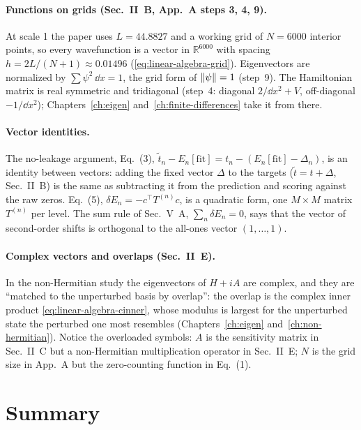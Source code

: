 \paragraph{Functions on grids (Sec.~II~B, App.~A steps 3, 4, 9).} At scale 1 the paper uses $L=44.8827$ and a working grid of $N=6000$ interior points, so every wavefunction is a vector in $\mathbb R^{6000}$ with spacing $h=2L/(N+1)\approx0.01496$ (\cref{eq:linear-algebra-grid}). Eigenvectors are normalized by $\sum\psi^2\,\dd x=1$, the grid form of $\left\lVert \psi\right\rVert=1$ (step~9). The Hamiltonian matrix is real symmetric and tridiagonal (step~4: diagonal $2/\dd x^2+V$, off-diagonal $-1/\dd x^2$); Chapters~\ref{ch:eigen} and~\ref{ch:finite-differences} take it from there.

\paragraph{Vector identities.} The no-leakage argument, Eq.~(3), $\tilde t_n-E_n[\mathrm{fit}]=t_n-(E_n[\mathrm{fit}]-\Delta_n)$, is an identity between vectors: adding the fixed vector $\Delta$ to the targets ($\tilde t=t+\Delta$, Sec.~II~B) is the same as subtracting it from the prediction and scoring against the raw zeros. Eq.~(5), $\delta E_n=-c^\top T^{(n)}c$, is a quadratic form, one $M\times M$ matrix $T^{(n)}$ per level. The sum rule of Sec.~V~A, $\sum_n\delta E_n=0$, says that the vector of second-order shifts is orthogonal to the all-ones vector $(1,\dots,1)$.

\paragraph{Complex vectors and overlaps (Sec.~II~E).} In the non-Hermitian study the eigenvectors of $H+iA$ are complex, and they are ``matched to the unperturbed basis by overlap'': the overlap is the complex inner product \cref{eq:linear-algebra-cinner}, whose modulus is largest for the unperturbed state the perturbed one most resembles (Chapters~\ref{ch:eigen} and~\ref{ch:non-hermitian}). Notice the overloaded symbols: $A$ is the sensitivity matrix in Sec.~II~C but a non-Hermitian multiplication operator in Sec.~II~E; $N$ is the grid size in App.~A but the zero-counting function in Eq.~(1).

\section{Summary}\label{sec:linear-algebra-summary}

